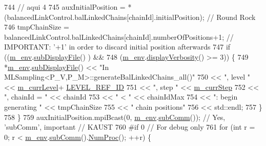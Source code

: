 \begin{DoxyCode}
744       \textcolor{comment}{// aqui 4}
745       auxInitialPosition = *(balancedLinkControl.balLinkedChains[chainId].initialPosition); \textcolor{comment}{// Round Rock}
746       tmpChainSize = balancedLinkControl.balLinkedChains[chainId].numberOfPositions+1; \textcolor{comment}{// IMPORTANT: '+1'
       in order to discard initial position afterwards}
747       \textcolor{keywordflow}{if} ((\hyperlink{class_q_u_e_s_o_1_1_m_l_sampling_a13f1ca4fe9f94822fe572a743eaced1d}{m\_env}.\hyperlink{class_q_u_e_s_o_1_1_base_environment_a8a0064746ae8dddfece4229b9ad374d6}{subDisplayFile}()       ) &&
748           (\hyperlink{class_q_u_e_s_o_1_1_m_l_sampling_a13f1ca4fe9f94822fe572a743eaced1d}{m\_env}.\hyperlink{class_q_u_e_s_o_1_1_base_environment_a1fe5f244fc0316a0ab3e37463f108b96}{displayVerbosity}() >= 3)) \{
749         *\hyperlink{class_q_u_e_s_o_1_1_m_l_sampling_a13f1ca4fe9f94822fe572a743eaced1d}{m\_env}.\hyperlink{class_q_u_e_s_o_1_1_base_environment_a8a0064746ae8dddfece4229b9ad374d6}{subDisplayFile}() << \textcolor{stringliteral}{"In
       MLSampling<P\_V,P\_M>::generateBalLinkedChains\_all()"}
750                                 << \textcolor{stringliteral}{", level "}            << \hyperlink{class_q_u_e_s_o_1_1_m_l_sampling_af9416874c856e50f3b35270e801f17e4}{m\_currLevel}+
      \hyperlink{_m_l_sampling_level_options_8h_a68d15eaf394d210effcf584b938206d3}{LEVEL\_REF\_ID}
751                                 << \textcolor{stringliteral}{", step "}             << \hyperlink{class_q_u_e_s_o_1_1_m_l_sampling_a1b1f8ccb4823bdfa26ec652f0807c63e}{m\_currStep}
752                                 << \textcolor{stringliteral}{", chainId = "}        << chainId
753                                 << \textcolor{stringliteral}{" < "}                 << chainIdMax
754                                 << \textcolor{stringliteral}{": begin generating "} << tmpChainSize
755                                 << \textcolor{stringliteral}{" chain positions"}
756                                 << std::endl;
757       \}
758     \}
759     auxInitialPosition.mpiBcast(0, \hyperlink{class_q_u_e_s_o_1_1_m_l_sampling_a13f1ca4fe9f94822fe572a743eaced1d}{m\_env}.\hyperlink{class_q_u_e_s_o_1_1_base_environment_affe39f53e3d5d678842413370af09145}{subComm}()); \textcolor{comment}{// Yes, 'subComm', important // KAUST}
760 \textcolor{preprocessor}{#if 0 // For debug only}
761 \textcolor{preprocessor}{}    \textcolor{keywordflow}{for} (\textcolor{keywordtype}{int} r = 0; r < \hyperlink{class_q_u_e_s_o_1_1_m_l_sampling_a13f1ca4fe9f94822fe572a743eaced1d}{m\_env}.\hyperlink{class_q_u_e_s_o_1_1_base_environment_affe39f53e3d5d678842413370af09145}{subComm}().\hyperlink{class_q_u_e_s_o_1_1_mpi_comm_aa780721ae0fdeabc5a15e04cb0cad964}{NumProc}(); ++r) \{

\end{DoxyCode}

